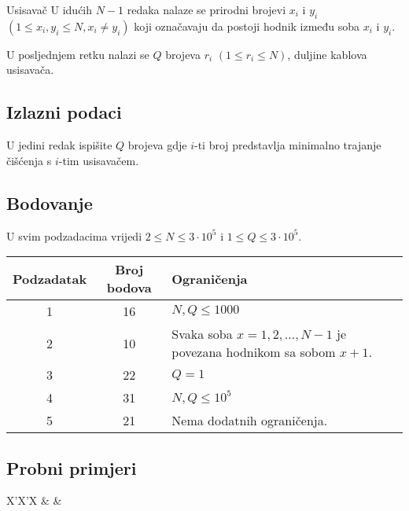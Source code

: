 \begin{statement}[
  problempoints=100,
  timelimit=1 sekunda,
  memorylimit=512 MiB,
]{Usisavač}
U idućih $N - 1$ redaka nalaze se prirodni brojevi $x_i$ i $y_i$ $(1 \le x_i, y_i \le N, x_i \ne y_i)$ koji označavaju da postoji hodnik između soba $x_i$ i $y_i$.

U posljednjem retku nalazi se $Q$ brojeva $r_i$ $(1 \le r_i \le N)$, duljine kablova usisavača.

\subsection*{Izlazni podaci}

U jedini redak ispišite $Q$ brojeva gdje $i$-ti broj predstavlja minimalno trajanje čišćenja s $i$-tim usisavačem.

\subsection*{Bodovanje}

U svim podzadacima vrijedi $2 \le N \le 3 \cdot 10^5$ i $1 \le Q \le 3 \cdot 10^5$.

{\renewcommand{\arraystretch}{1.4}
  \setlength{\tabcolsep}{6pt}
  \begin{tabular}{ccl}
   Podzadatak & Broj bodova & Ograničenja \\ \midrule
   	1 & 16 & $N, Q \le 1000$ \\
    2 & 10 & Svaka soba $x = 1, 2, \dots, N - 1$ je povezana hodnikom sa sobom $x + 1$. \\
    3 & 22 & $Q = 1$ \\
    4 & 31 & $N, Q \leq 10^5$ \\
    5 & 21 & Nema dodatnih ograničenja. \\
\end{tabular}}

\subsection*{Probni primjeri}
\begin{tabularx}{\textwidth}{X'X'X}
 &
 &
\end{tabularx}


\end{statement}
